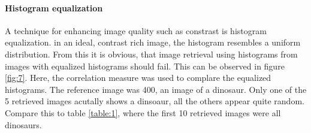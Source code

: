 \documentclass[11pt,a4paper]{article}
\begin{document}
 
\paragraph{Histogram equalization}
A technique for enhancing image quality such as constrast is histogram equalization. in an ideal, contrast rich image, the histogram resembles a uniform distribution. From this it is obvious, that image retrieval using histograms from images with equalized histograms should fail. This can be observed in figure \ref{fig:7}. Here, the correlation measure was used to complare the equalized histograms. The reference image was 400, an image of a dinosaur. Only one of the 5 retrieved images acutally shows a dinsoaur, all the others appear quite random. Compare this to table \ref{table:1}, where the first 10 retrieved images were all dinosaurs.
\end{document}
